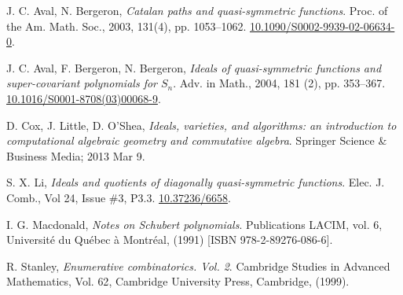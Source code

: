 \documentclass[11pt,oneside]{amsart}
\theoremstyle{definition}
\numberwithin{equation}{section}
\begin{document}
\begin{thebibliography}{999}


 J. C. Aval, N. Bergeron,
\textit{Catalan paths and quasi-symmetric functions}.
Proc. of the Am. Math. Soc., 2003, 131(4), pp. 1053--1062.
\href{https://doi.org/10.1090/S0002-9939-02-06634-0}{10.1090/S0002-9939-02-06634-0}.

 J. C. Aval, F. Bergeron, N. Bergeron,
\textit{Ideals of quasi-symmetric functions and super-covariant polynomials for $S_n$}.
Adv. in Math., 2004, 181 (2), pp. 353--367.
\href{https://doi.org/10.1016/S0001-8708(03)00068-9}{10.1016/S0001-8708(03)00068-9}.


 D. Cox, J. Little, D. O'Shea,
\textit{Ideals, varieties, and algorithms: an introduction to computational
algebraic geometry and commutative algebra}.
Springer Science \& Business Media; 2013 Mar 9.


 S. X. Li,
\textit{Ideals and quotients of diagonally quasi-symmetric functions}.
Elec. J. Comb., Vol 24, Issue \#3, P3.3.
\href{https://doi.org/10.37236/6658}{10.37236/6658}.

 I. G. Macdonald,
\textit{Notes on Schubert polynomials}.
Publications LACIM, vol. 6, Universit\'e du Qu\'ebec \`a Montr\'eal,  (1991) [ISBN 978-2-89276-086-6].



 R. Stanley,
\textit{Enumerative combinatorics. {V}ol. 2}.
{Cambridge Studies in Advanced Mathematics}, Vol. {62},
{Cambridge University Press, Cambridge}, (1999).


\end{thebibliography}
\end{document}
